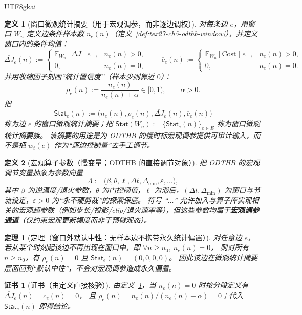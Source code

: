 \documentclass[12pt]{article}
\newtheorem{definition}{定义}[section]
\newtheorem{theorem}{定理}[section]
\newtheorem{Certificate}{证书}[section]
\begin{document}
\begin{CJK*}{UTF8}{gkai}
\begin{definition}[窗口微观统计摘要（用于宏观调参，而非逐边调权）]
\label{def:tex27-ch5-odthb-microstat}
对每条边 $e$，用窗口 $W_n$ 定义边条件样本数 $n_e(n)$（定义~\ref{def:tex27-ch5-odthb-window}），并定义窗口内的条件均值：
\[
  \overline{\Delta J}_e(n):=
  \begin{cases}
    \mathbb{E}_{W_n}[\Delta J\mid e], & n_e(n)>0,\\
    0, & n_e(n)=0,
  \end{cases}
  \qquad
  \overline{c}_e(n):=
  \begin{cases}
    \mathbb{E}_{W_n}[\mathrm{Cost}\mid e], & n_e(n)>0,\\
    0, & n_e(n)=0.
  \end{cases}
\]
并用收缩因子刻画“统计置信度”（样本少则靠近 $0$）：
\[
  \rho_e(n):=\frac{n_e(n)}{n_e(n)+\alpha}\in[0,1),\qquad \alpha>0.
\]
把
\[
  \mathsf{Stat}_e(n):=\bigl(n_e(n),\rho_e(n),\overline{\Delta J}_e(n),\overline{c}_e(n)\bigr)
\]
称为边 $e$ 的窗口微观统计摘要；把 $\mathsf{Stat}(W_n):=\{\mathsf{Stat}_e(n)\}_{e\in E}$ 称为窗口微观统计摘要族。
该摘要的用途是为 ODTHB 的慢时标宏观调参提供可审计输入，而不是把 $w_t(e)$ 作为“逐边控制量”去手工调节。
\end{definition}

\begin{definition}[宏观算子参数（慢变量；ODTHB 的直接调节对象）]
\label{def:tex27-ch5-odthb-macroparam}
把 ODTHB 的宏观调节变量抽象为参数向量
\[
  \Lambda:=\bigl(\beta,\theta,\ell,\Delta t,\Delta_{\min},\varepsilon,\ldots\bigr),
\]
其中 $\beta$ 为逆温度/退火参数，$\theta$ 为门控阈值，$\ell$ 为滞后，$(\Delta t,\Delta_{\min})$ 为窗口与节流设定，$\varepsilon>0$ 为“永不硬剪裁”的探索保底。
符号 ``$\ldots$'' 允许加入与算子库实现相关的宏观超参数（例如步长/投影/clip/退火速率等），但这些参数均属于\textbf{宏观调参通道}（仅约束宏观更新幅度而非干预微观态）。
\end{definition}

\begin{theorem}[定理（窗口外默认中性：无样本边不携带永久统计偏置）]
\label{thm:tex27-ch5-odthb-reset}
对任意边 $e$，若从某个时刻起该边不再出现在窗口中，即 $\forall n\ge n_0,\ n_e(n)=0$，
则对所有 $n\ge n_0$，有 $\rho_e(n)=0$ 且 $\mathsf{Stat}_e(n)=(0,0,0,0)$。
因此该边在微观统计摘要层面回到“默认中性”，不会对宏观调参造成永久偏置。
\end{theorem}

\begin{Certificate}[证书（由定义直接核验）]
\label{cert:tex27-ch5-odthb-reset}
由定义~\ref{def:tex27-ch5-odthb-microstat}，当 $n_e(n)=0$ 时按分段定义有 $\overline{\Delta J}_e(n)=\overline{c}_e(n)=0$，
且 $\rho_e(n)=n_e(n)/(n_e(n)+\alpha)=0$；代入 $\mathsf{Stat}_e(n)$ 即得结论。
\end{Certificate}


\end{CJK*}
\end{document}
